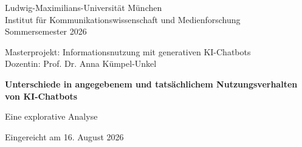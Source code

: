 \begin{titlepage}
\thispagestyle{empty}
\singlespacing




\begin{flushleft}
\small
Ludwig-Maximilians-Universität München\\
Institut für Kommunikationswissenschaft und Medienforschung\\
Sommersemester 2026
\end{flushleft}


\vspace{1.25cm}

\begin{center}
\small
Masterprojekt: Informationsnutzung mit generativen KI-Chatbots\\
Dozentin: Prof. Dr. Anna Kümpel-Unkel
\end{center}


\vspace{1.25cm}

\begin{center}
{\LARGE\bfseries
Unterschiede in angegebenem und tatsächlichem Nutzungsverhalten von KI-Chatbots
}

\vspace{0.6cm}

{\large Eine explorative Analyse}
\end{center}


\vspace{1.25cm}

\begin{center}
Eingereicht am 16. August 2026
\end{center}


\end{titlepage}
